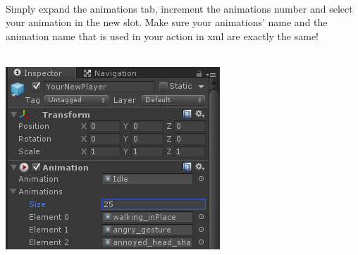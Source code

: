 \documentclass[11pt]{article} %
\begin{document}
~\\
Simply expand the animations tab, increment the animations number and select your animation in the new slot. Make sure your animations' name and the animation name that is used in your action in xml are exactly the same!

~\\
\includegraphics{15}
\end{document}
